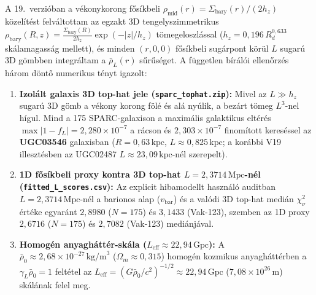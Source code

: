 \documentclass[10pt,a4paper]{article}
\begin{document}
\par
A 19.\ verzi\'oban a v\'ekonykorong f\H{o}s\'ikbeli $\rho_{\text{mid}}(r) = \Sigma_{\text{bary}}(r)/(2h_z)$ k\"ozel\'it\'est felv\'altottam az egzakt 3D tengelyszimmetrikus $\rho_{\text{bary}}(R,z) = \frac{\Sigma_{\text{bary}}(R)}{2h_z}\exp(-|z|/h_z)$ t\"omegeloszl\'assal ($h_z = 0{,}196\,R_d^{0{,}633}$ sk\'alamagass\'ag mellett), \'es minden $(r,0,0)$ f\H{o}s\'ikbeli sug\'arpont k\"or\"ul $L$ sugar\'u 3D g\"ombben integr\'altam a $\bar{\rho}_L(r)$ s\H{u}r\H{u}s\'eget. A f\"uggetlen b\'ir\'al\'oi ellen\H{o}rz\'es h\'arom d\"ont\H{o} numerikus t\'enyt igazolt:
\begin{enumerate}\setlength{\itemsep}{1pt}\setlength{\parskip}{0pt}\setlength{\topsep}{1pt}
  \item \textbf{Izol\'alt galaxis 3D top-hat jele (\texttt{sparc\_tophat.zip}):} Mivel az $L \gg h_z$ sugar\'u 3D g\"omb a v\'ekony korong f\"ol\'e \'es al\'a ny\'ulik, a bez\'art t\"omeg $L^3$-nel h\'igul. Mind a 175 SPARC-galaxison a maxim\'alis galaktikus elt\'er\'es $\max |1 - f_L| = 2{,}280\times 10^{-7}$ a r\'acson \'es \textbf{$2{,}303\times 10^{-7}$} finom\'itott keres\'essel az \textbf{UGC03546} galaxisban ($R = 0{,}63\,\text{kpc}$, $L \approx 0{,}825\,\text{kpc}$; a kor\'abbi V19 illeszt\'esben az UGC02487 $L \approx 23{,}09\,\text{kpc}$-n\'el szerepelt).
  \item \textbf{1D f\H{o}s\'ikbeli proxy kontra 3D top-hat $L = 2{,}3714\,\text{Mpc}$-n\'el (\texttt{fitted\_L\_scores.csv}):} Az explicit hibamodellt haszn\'al\'o auditban $L = 2{,}3714\,\text{Mpc}$-n\'el a barionos alap ($v_{\text{bar}}$) \'es a val\'odi 3D top-hat medi\'an $\chi^2_\nu$ \'ert\'eke egyar\'ant \textbf{$2{,}8980$} ($N=175$) \'es \textbf{$3{,}1433$} (Vak-123), szemben az 1D proxy $2{,}6716$ ($N=175$) \'es $2{,}7082$ (Vak-123) medi\'anj\'aval.
  \item \textbf{Homog\'en anyagh\'att\'er-sk\'ala ($L_{\text{eff}} \approx 22{,}94\,\text{Gpc}$):} A $\bar{\rho}_0 \approx 2{,}68\times 10^{-27}\,\text{kg/m}^3$ ($\Omega_m \approx 0{,}315$) homog\'en kozmikus anyagh\'att\'erben a $\gamma_L\bar{\rho}_0 = 1$ felt\'etel az $L_{\text{eff}} = (G\bar{\rho}_0/c^2)^{-1/2} \approx 22{,}94\,\text{Gpc}$ ($7{,}08\times 10^{26}\,\text{m}$) sk\'al\'anak felel meg.
\end{enumerate}
\end{document}
